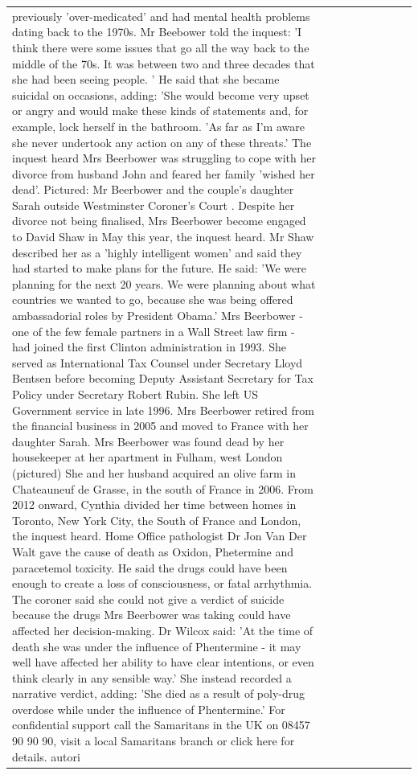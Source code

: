 \begin{table}[H]
\begin{tabular}{lllrlllll}
previously 'over-medicated' and had mental health problems dating back to the 1970s. Mr Beebower told the inquest: 'I think there were some issues that go all the way back to the middle of the 70s. It was between two and three decades that she had been seeing people. ' He said that she became suicidal on occasions, adding: 'She would become very upset or angry and would make these kinds of statements and, for example, lock herself in the bathroom. 'As far as I'm aware she never undertook any action on any of these threats.' The inquest heard Mrs Beerbower was struggling to cope with her divorce from husband John and feared her family 'wished her dead'. Pictured: Mr Beerbower and the couple's daughter Sarah outside Westminster Coroner's Court . Despite her divorce not being finalised, Mrs Beerbower become engaged to David Shaw in May this year, the inquest heard. Mr Shaw described her as a 'highly intelligent women' and said they had started to make plans for the future. He said: 'We were planning for the next 20 years. We were planning about what countries we wanted to go, because she was being offered ambassadorial roles by President Obama.' Mrs Beerbower - one of the few female partners in a Wall Street law firm - had joined the first Clinton administration in 1993. She served as International Tax Counsel under Secretary Lloyd Bentsen before becoming Deputy Assistant Secretary for Tax Policy under Secretary Robert Rubin. She left US Government service in late 1996. Mrs Beerbower retired from the financial business in 2005 and moved to France with her daughter Sarah. Mrs Beerbower was found dead by her housekeeper at her apartment in Fulham, west London (pictured) She and her husband acquired an olive farm in Chateauneuf de Grasse, in the south of France in 2006. From 2012 onward, Cynthia divided her time between homes in Toronto, New York City, the South of France and London, the inquest heard. Home Office pathologist Dr Jon Van Der Walt gave the cause of death as Oxidon, Phetermine and paracetemol toxicity. He said the drugs could have been enough to create a loss of consciousness, or fatal arrhythmia. The coroner said she could not give a verdict of suicide because the drugs Mrs Beerbower was taking could have affected her decision-making. Dr Wilcox said: 'At the time of death she was under the influence of Phentermine - it may well have affected her ability to have clear intentions, or even think clearly in any sensible way.' She instead recorded a narrative verdict, adding: 'She died as a result of poly-drug overdose while under the influence of Phentermine.' For confidential support call the Samaritans in the UK on 08457 90 90 90, visit a local Samaritans branch or click here for details. autori \\

\end{tabular}
\end{table}
